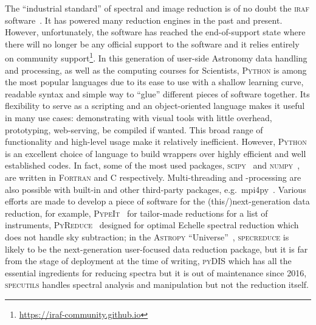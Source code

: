 \documentclass[fleqn,usenatbib]{mnras}
\begin{document}
The ``industrial standard'' of spectral and image reduction is of no doubt the
\textsc{iraf} software~\citep{1986SPIE..627..733T, 1993ASPC...52..173T}. It has powered many
reduction engines in the past and present. However, unfortunately, the software has reached
the end-of-support state where there will no longer be any official support to the software
and it relies entirely on community support\footnote{\url{https://iraf-community.github.io}}.
In this generation of user-side Astronomy data handling and processing, as well as the
computing courses for Scientists, \textsc{Python} is among the most popular languages due to
its ease to use with a shallow learning curve, readable syntax and simple way to ``glue''
different pieces of software together. Its flexibility to serve as a scripting and an
object-oriented language makes it useful in many use cases: demonstrating with visual tools
with little overhead, prototyping, web-serving, be compiled if wanted. This broad range of
functionality and high-level usage make it relatively inefficient. However, \textsc{Python}
is an excellent choice of language to build wrappers over highly efficient and well
established codes. In fact, some of the most used packages,
\textsc{scipy}~\citep{2020SciPy-NMeth} and \textsc{numpy}~\citep{2020NumPy-Array},
are written in \textsc{Fortran} and \textsc{C} respectively. Multi-threading and -processing
are also possible with built-in and other third-party packages, e.g.\ mpi4py~\citep{DALCIN20111124}. 
Various efforts are made to develop a piece of software for the (this/)next-generation data reduction,
for example, \textsc{PypeIt}~\citep{pypeit:zenodo, pypeit:joss_pub} for tailor-made reductions
for a list of instruments, \textsc{PyReduce}~\citep{2021A&A...646A..32P} designed for optimal
Echelle spectral reduction which does not handle sky subtraction;
in the \textsc{Astropy} ``Universe''~\citep{astropy:2013, astropy:2018}, \textsc{specreduce}
is likely to be the next-generation user-focused data reduction package, but it is far from
the stage of deployment at the time of writing, \textsc{pyDIS} which has all the essential
ingredients for reducing spectra but it is out of maintenance since 2016, \textsc{specutils}
handles spectral analysis and manipulation but not the reduction itself.
\end{document}
